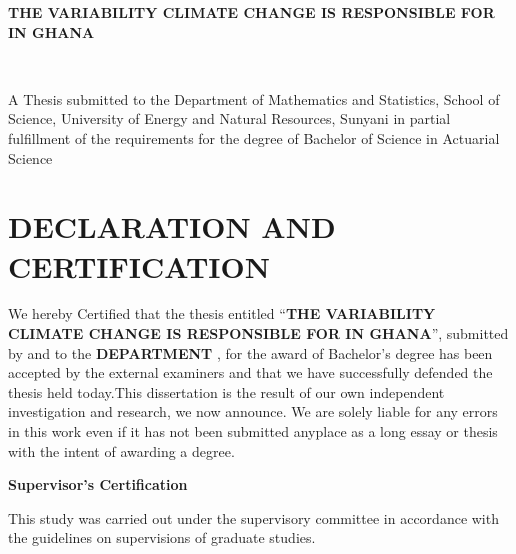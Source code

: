 \documentclass[12pt,a4paper]{book}
\begin{document}
	\begin{titlepage}
		\begin{center}
			{\normalfont \textbf{THE VARIABILITY CLIMATE CHANGE IS RESPONSIBLE FOR IN GHANA}}
			
			\vspace{3.7cm}
			{}\\
			\vspace{1cm}
			{}
			\vspace{1.7cm}
			
			\begin{center}
				{\normalfont A Thesis submitted to the Department of Mathematics and Statistics, School of Science, University of Energy and Natural Resources, Sunyani in partial fulfillment of the requirements for the degree of Bachelor of Science in Actuarial Science }\\
				\vspace{2cm}	
				{\normalfont \date{\today}}
			\end{center}
			
		\end{center}
		
		\vfill
	\end{titlepage}	
	\newpage
	{\section*{DECLARATION AND CERTIFICATION}}
	We hereby Certified that the thesis entitled “\textbf{THE VARIABILITY CLIMATE CHANGE IS RESPONSIBLE FOR IN  GHANA}”, submitted by
	{} and {} to the \textbf{DEPARTMENT} , for the award of  Bachelor’s degree has been accepted by the external examiners and that we have successfully defended the thesis  held today.This dissertation is the result of our own independent investigation and research, we now announce. We are solely liable for any errors in this work even if it has not been submitted anyplace as a long essay or thesis with the intent of awarding a degree.
	\\
	\begin{center}\textbf{\normalfont \textbf{Supervisor's Certification}}\end{center}
	This study was carried out under the supervisory committee  in accordance with the guidelines on supervisions of graduate studies.\\
\end{document}
